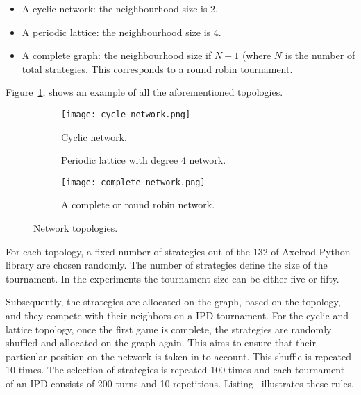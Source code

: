 \begin{itemize}
    \item A cyclic network: the neighbourhood size is 2. %
    \item A periodic lattice: the neighbourhood size is 4. %
    \item A complete graph: the neighbourhood size if \(N-1\) (where \(N\) is
        the number of total strategies. This corresponds to a round robin
        tournament. %
\end{itemize}

Figure~\ref{fig:networks}, shows an example of all the aforementioned topologies.

\begin{figure}[h]  %
\centering
    \begin{subfigure}[h]{0.45\textwidth}
    \centering
        \texttt{[image: cycle\_network.png]}
    \caption{Cyclic network.}
    \end{subfigure}
\hfill
    \begin{subfigure}[h]{0.52\textwidth}\centering
    \centering
        
    \caption{Periodic lattice with degree 4 network.}
    \end{subfigure}
\hfill
    \begin{subfigure}[h]{0.52\textwidth}\centering
    \centering
        \texttt{[image: complete-network.png]}
    \caption{A complete or round robin network.}
    \end{subfigure}
\caption{Network topologies.}
\label{fig:networks}
\end{figure}

For each topology, a fixed number of strategies out of the 132 of Axelrod-Python
library are chosen randomly. The number of strategies define the size of the
tournament. In the experiments the tournament size can be either five or fifty.

Subsequently, the strategies are allocated on the graph, based
on the topology, and they compete with their neighbors on a IPD tournament.
For the cyclic and lattice topology, once the first game is complete,
the strategies are randomly shuffled and allocated on the graph again. This aims
to ensure that their particular position on the network is taken in to account.
This shuffle is repeated 10 times. The selection of strategies is repeated 100 times
and each tournament of an IPD consists of 200 turns and 10 repetitions.
Listing~ illustrates these rules.

